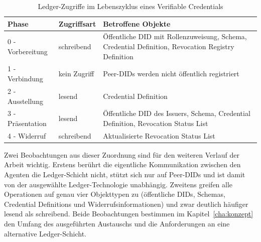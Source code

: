 \begin{table}[htbp]
\renewcommand{\arraystretch}{1.3}
  \centering
  \caption{Ledger-Zugriffe im Lebenszyklus eines Verifiable Credentials}
  \label{tab:beispiel-ledgerzugriffe}
  \begin{tabular}{p{} p{} p{}}
    \toprule
    \textbf{Phase} & \textbf{Zugriffsart} & \textbf{Betroffene Objekte} \\
    \midrule
    0 - Vorbereitung & schreibend &
    Öffentliche DID mit Rollenzuweisung, Schema, Credential Definition, Revocation Registry Definition \\
    1 - Verbindung & kein Zugriff &
    Peer-DIDs werden nicht öffentlich registriert \\
    2 - Ausstellung & lesend &
    Credential Definition \\
    3 - Präsentation & lesend &
    Öffentliche DID des Issuers, Schema, Credential Definition, Revocation Status List \\
    4 - Widerruf & schreibend &
    Aktualisierte Revocation Status List \\
    \bottomrule
  \end{tabular}
\end{table}

Zwei Beobachtungen aus dieser Zuordnung sind für den weiteren Verlauf der Arbeit wichtig. Erstens berührt die eigentliche Kommunikation zwischen den Agenten die Ledger-Schicht nicht, stützt sich nur auf Peer-DIDs und ist damit von der ausgewählte Ledger-Technologie unabhängig. Zweitens greifen alle Operationen auf genau vier Objekttypen zu (öffentliche DIDs, Schemas, Credential Definitions und Widerrufsinformationen) und zwar deutlich häufiger lesend als schreibend. Beide Beobachtungen bestimmen im Kapitel~\ref{cha:konzept} den Umfang des ausgeführten Austauschs und die Anforderungen an eine alternative Ledger-Schicht.